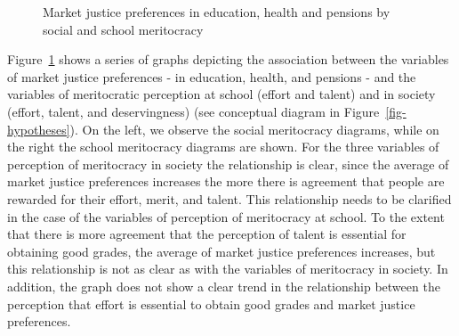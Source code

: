 \documentclass[
  letterpaper,
  DIV=11,
  numbers=noendperiod]{scrartcl}
\begin{document}
\begin{figure}


\caption{\label{fig-bivariate}Market justice preferences in education,
health and pensions by social and school meritocracy}

\end{figure}%

Figure~\ref{fig-bivariate} shows a series of graphs depicting the
association between the variables of market justice preferences - in
education, health, and pensions - and the variables of meritocratic
perception at school (effort and talent) and in society (effort, talent,
and deservingness) (see conceptual diagram in
Figure~\ref{fig-hypotheses}). On the left, we observe the social
meritocracy diagrams, while on the right the school meritocracy diagrams
are shown. For the three variables of perception of meritocracy in
society the relationship is clear, since the average of market justice
preferences increases the more there is agreement that people are
rewarded for their effort, merit, and talent. This relationship needs to
be clarified in the case of the variables of perception of meritocracy
at school. To the extent that there is more agreement that the
perception of talent is essential for obtaining good grades, the average
of market justice preferences increases, but this relationship is not as
clear as with the variables of meritocracy in society. In addition, the
graph does not show a clear trend in the relationship between the
perception that effort is essential to obtain good grades and market
justice preferences.
\end{document}
